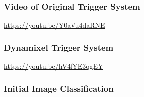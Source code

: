 \documentclass[11pt, hidelinks]{report}
\begin{document}
\subsubsection{Video of Original Trigger System} \label{app:ogtrig}
	\begin{center}
	    \url{https://youtu.be/Y0aVu4daRNE}
	\end{center}

\subsubsection{Dynamixel Trigger System} \label{app:dyntrig}
	\begin{center}
	    \url{https://youtu.be/hV4fYE3qgEY}
	\end{center}


\subsubsection{Initial Image Classification} \label{app:ogimg}
	\begin{center}
	\end{center}
\end{document}

